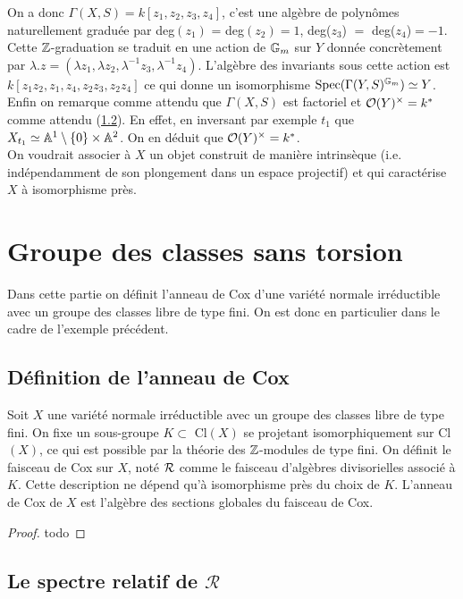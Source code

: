On a donc $\Gamma(X, S)=k[z_1,z_2,z_3,z_4]$, c'est une algèbre de polynômes naturellement graduée par deg$(z_1)$ = deg$(z_2)=1$, deg($z_3$) $=$ deg($z_4$)$=-1$. Cette $\mathbb{Z}$-graduation se traduit en une action de $\mathbb{G}_m$ sur $Y$ donnée  concrètement par $\lambda.z=(\lambda z_1,\lambda z_2,\lambda^{-1} z_3,\lambda^{-1} z_4)$. L'algèbre des invariants sous cette action est $k[z_1z_2,z_1,z_4,z_2z_3,z_2z_4]$ ce qui donne un isomorphisme $\operatorname{Spec}(\Gamma(Y,S)^{\mathbb{G}_m})\simeq Y$. 
Enfin on remarque comme attendu que $\Gamma(X, S)$ est factoriel et $\mathcal{O}(Y)^{\times}=k^*$ comme attendu (\ref{}). En effet, en inversant par exemple $t_1$  que $X_{t_1}\simeq \mathbb{A}^{1}\setminus \lbrace0\rbrace\times\mathbb{A}^{2}$. On en déduit que $\mathcal{O}(Y)^{\times}=k^*$.\\

On voudrait associer à $X$ un objet construit de manière intrinsèque (i.e. indépendamment de son plongement dans un espace projectif) et qui caractérise $X$ à isomorphisme près.
 

\section{Groupe des classes sans torsion}

Dans cette partie on définit l'anneau de Cox d'une variété normale irréductible avec un groupe des classes libre de type fini. On est donc en particulier dans le cadre de l'exemple précédent.

\subsection{Définition de l'anneau de Cox}

\begin{cons}
Soit $X$ une variété normale irréductible avec un groupe des classes libre de type fini. On fixe un sous-groupe $K\subset $ Cl$(X)$ se projetant isomorphiquement sur Cl$(X)$, ce qui est possible par la théorie des $\mathbb{Z}$-modules de type fini. On définit le faisceau de Cox sur $X$, noté $\mathcal{R}$ comme le faisceau d'algèbres divisorielles associé à $K$. Cette description ne dépend qu'à isomorphisme près du choix de $K$. L'anneau de Cox de $X$ est l'algèbre des sections globales du faisceau de Cox. 
\end{cons}
\begin{proof}
todo
\end{proof}



\subsection{Le spectre relatif de $\mathcal{R}$}


